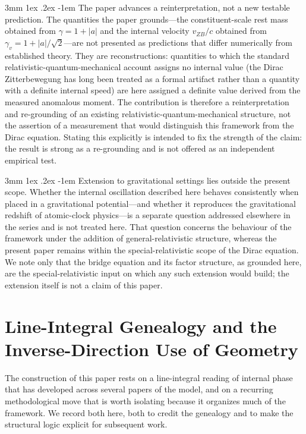 \documentclass[%
 reprint, amsmath,amssymb, aps, prb, ]{revtex4-2}
\makeatletter
\numberwithin{equation}{section}
\renewcommand\paragraph{%
  \@startsection{paragraph}{4}{\z@}%
    {3mm \@plus 1ex \@minus .2ex}%
    {-1em}%
    {\normalfont\normalsize\itshape}}
\makeatother
\begin{document}
\paragraph{The paper advances a reinterpretation, not a new testable prediction.}
The quantities the paper grounds---the constituent-scale rest mass obtained from $\gamma = 1 + \lvert a\rvert$ and the internal velocity $v_{ZB}/c$ obtained from $\gamma_v = 1 + \lvert a\rvert/\sqrt{2}$---are not presented as predictions that differ numerically from established theory. They are reconstructions: quantities to which the standard relativistic-quantum-mechanical account assigns no internal value (the Dirac Zitterbewegung has long been treated as a formal artifact rather than a quantity with a definite internal speed) are here assigned a definite value derived from the measured anomalous moment. The contribution is therefore a reinterpretation and re-grounding of an existing relativistic-quantum-mechanical structure, not the assertion of a measurement that would distinguish this framework from the Dirac equation. Stating this explicitly is intended to fix the strength of the claim: the result is strong as a re-grounding and is not offered as an independent empirical test.

\paragraph{Extension to gravitational settings lies outside the present scope.}
Whether the internal oscillation described here behaves consistently when placed in a gravitational potential---and whether it reproduces the gravitational redshift of atomic-clock physics---is a separate question addressed elsewhere in the series and is not treated here. That question concerns the behaviour of the framework under the addition of general-relativistic structure, whereas the present paper remains within the special-relativistic scope of the Dirac equation. We note only that the bridge equation and its factor structure, as grounded here, are the special-relativistic input on which any such extension would build; the extension itself is not a claim of this paper.

\section{Line-Integral Genealogy and the Inverse-Direction Use of Geometry}
\label{app:genealogy}

The construction of this paper rests on a line-integral reading of internal phase that has developed across several papers of the model, and on a recurring methodological move that is worth isolating because it organizes much of the framework. We record both here, both to credit the genealogy and to make the structural logic explicit for subsequent work.
\end{document}
